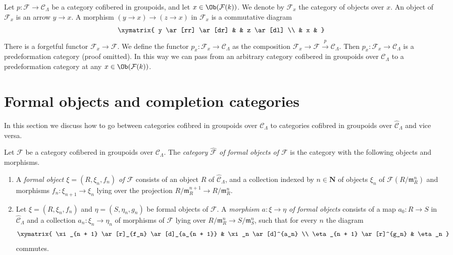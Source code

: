 \begin{remark}
\label{remark-localize-cofibered-groupoid}
Let $p: \mathcal{F} \to \mathcal{C}_\Lambda$ be a category cofibered in
groupoids, and let $x \in \Ob(\mathcal{F}(k))$.  We denote by
$\mathcal{F}_x$ the category of objects over $x$.
An object of $\mathcal{F}_x$ is an arrow $y \to x$.
A morphism $(y \to x) \to (z \to x)$ in $\mathcal{F}_x$ is a commutative
diagram
$$
\xymatrix{
y \ar[rr] \ar[dr] & & z \ar[dl] \\
& x &
}
$$
There is a forgetful functor $\mathcal{F}_x \to \mathcal{F}$. We define
the functor $p_x : \mathcal{F}_x \to \mathcal{C}_\Lambda$ as the
composition
$\mathcal{F}_x \to \mathcal{F} \xrightarrow{p} \mathcal{C}_\Lambda$.
Then $p_x : \mathcal{F}_x \to \mathcal{C}_\Lambda$ is a
predeformation category (proof omitted). In this way we can pass from an
arbitrary category cofibered in groupoids over $\mathcal{C}_\Lambda$
to a predeformation category at any $x \in \Ob(\mathcal{F}(k))$.
\end{remark}






\section{Formal objects and completion categories}
\label{section-formal-objects}

\noindent
In this section we discuss how to go between categories cofibred in
groupoids over $\mathcal{C}_\Lambda$ to categories cofibred in
groupoids over $\widehat{\mathcal{C}}_\Lambda$ and vice versa.

\begin{definition}
\label{definition-formal-objects}
Let $\mathcal{F}$ be a category cofibered in groupoids over
$\mathcal{C}_\Lambda$. The {\it category $\widehat{\mathcal{F}}$ of formal
objects of  $\mathcal{F}$} is the category with the following objects and
morphisms.
\begin{enumerate}
\item A {\it formal object $\xi = (R, \xi_n, f_n)$ of $\mathcal{F}$}
consists of an object $R$ of $\widehat{\mathcal{C}}_\Lambda$, and a collection
indexed by $n \in \mathbf{N}$ of objects $\xi_n$ of
$\mathcal{F}(R/\mathfrak m_R^n)$ and morphisms
$f_n : \xi_{n + 1} \to \xi_n$ lying over the projection
$R/\mathfrak m_R^{n + 1} \to R/\mathfrak m_R^n$.
\item Let $\xi = (R, \xi_n, f_n)$ and $\eta = (S, \eta_n, g_n)$ be
formal objects of $\mathcal{F}$.  A {\it morphism $a: \xi \to \eta$ of
formal objects} consists of a map $a_0 : R \to S$ in
$\widehat{\mathcal{C}}_\Lambda$ and a collection $a_n : \xi_n \to \eta_n$
of morphisms of $\mathcal{F}$ lying over
$R/\mathfrak m_R^n \to S/\mathfrak m_S^n$,
such that for every $n$ the diagram
$$
\xymatrix{
\xi_{n + 1} \ar[r]_{f_n} \ar[d]_{a_{n + 1}} & \xi_n \ar[d]^{a_n} \\
\eta_{n + 1} \ar[r]^{g_n} & \eta_n
}
$$
commutes.
\end{enumerate}
\end{definition}

